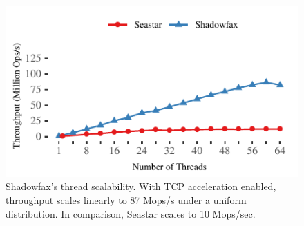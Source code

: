 \begin{figure}[t]
\includegraphics[width=\textwidth]{graphs/seastar.pdf}
\caption{
Shadowfax’s thread scalability. With TCP acceleration enabled,
throughput scales linearly to 87 Mops/s under a uniform distribution. In
comparison, Seastar scales to 10 Mops/sec.
}
\label{fig:seastar}
\end{figure}
